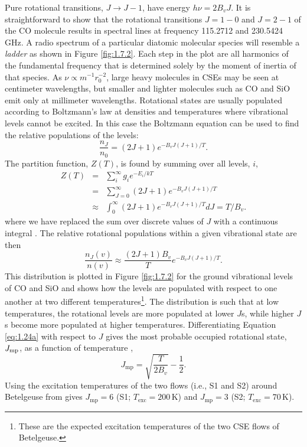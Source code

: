 Pure rotational transitions, $J\rightarrow J-1$, have energy $h\nu = 2B_{v}J$. It is straightforward to show that the rotational transitions $J=1-0$ and $J=2-1$ of the CO molecule results in spectral lines at frequency 115.2712 and 230.5424\,GHz. A radio spectrum of a particular diatomic molecular species will resemble a \textit{ladder} as shown in Figure \ref{fig:1.7.2}. Each step in the plot are all harmonics of the fundamental frequency that is determined solely by the moment of inertia of that species. As $\nu \propto m^{-1}r_{0}^{-2}$, large heavy molecules in CSEs may be seen at centimeter wavelengths, but smaller and lighter molecules such as CO and SiO emit only at millimeter wavelengths. 
Rotational states are usually populated according to Boltzmann's law at densities and temperatures where vibrational levels cannot be excited. In this case the Boltzmann equation can be used to find the relative populations of the levels:
\begin{equation}
\frac{n_{J}}{n_{0}}=(2J+1)e^{-B_{v}J(J+1)/T}.
\end{equation}\label{eq:1.20aa}
The partition function, $Z(T)$, is found by summing over all levels, $i$,
\begin{eqnarray}
Z(T) & = & \sum\limits_{i}^{\infty}g_{i}e^{-E_{i}/kT} \\
             & = & \sum\limits_{J=0}^{\infty}(2J+1)e^{-B_{v}J(J+1)/T} \\
              & \approx & \int ^{\infty} _{0}(2J+1)e^{-B_{v}J(J+1)/T} dJ =T/B_{v}.
\end{eqnarray}
where we have replaced the sum over discrete values of $J$ with a continuous integral \citep{shu_1991}. The relative rotational populations within a given vibrational state are then
\begin{equation}\label{eq:1.24a}
\dfrac{n_{J}(v)}{n(v)} \approx \frac{(2J+1)B_{v}}{T}e^{-B_{v}J(J+1)/T}.
\end{equation}
This distribution is plotted in Figure \ref{fig:1.7.2} for the ground vibrational levels of CO and SiO and shows how the levels are populated with respect to one another at two different temperatures\footnote{These are the expected excitation temperatures of the two CSE flows of Betelgeuse.}. The distribution is such that at low temperatures, the rotational levels are more populated at lower $J$s, while higher $J$s become more populated at higher temperatures. Differentiating Equation \ref{eq:1.24a} with respect to $J$
gives the most probable occupied rotational state, $J_{\rm{mp}}$, as a function of temperature \citep{rodgers_1991},
\begin{equation}
J_{\mathrm{mp}}=\sqrt{\frac{T}{2B_{v}}}-\frac{1}{2}.
\end{equation}
Using the excitation temperatures of the two flows (i.e., S1 and S2) around Betelgeuse from \cite{bernat_1979} gives $J_{\mathrm{mp}}=6$ (S1; $T_{\mathrm{exc}}=200$\,K) and $J_{\mathrm{mp}}=3$ (S2; $T_{\mathrm{exc}}=70$\,K).

